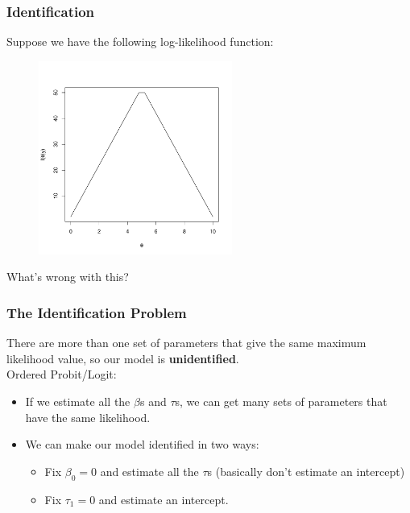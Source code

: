 \documentclass[handout]{beamer}
\begin{document}
\begin{frame}
\frametitle{Identification}
\pause
Suppose we have the following log-likelihood function:
\begin{figure}[!htp]
\begin{center}
\includegraphics[width=2.5in, height=2.5in]{logit-ident.pdf}
\end{center}
\end{figure}
\pause
What's wrong with this?
\end{frame}

\begin{frame}
\frametitle{The Identification Problem}
\pause
There are more than one set of parameters that give the same maximum
likelihood value, so our model is \textbf{unidentified}. \\
\pause
\bigskip
Ordered Probit/Logit:
\pause
\begin{itemize}
\item If we estimate all the $\beta$s and $\tau$s, we can get many
sets of parameters that have the same likelihood. 
\pause
\item We can make our model identified in two ways:
\pause
\begin{itemize}
\item Fix $\beta_0 = 0$ and estimate all the $\tau$s (basically don't estimate an intercept) 
\pause
\item Fix $\tau_1 = 0$ and estimate an intercept.
\end{itemize}
\end{itemize}
\end{frame}
\end{document}
